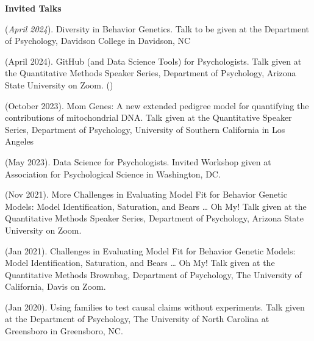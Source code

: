{\large {\bf Invited Talks}}\begin{etaremune}

\item\meb (\textit{April 2024}). Diversity in Behavior Genetics. Talk to be given at the Department of Psychology, Davidson College in Davidson, NC 
%
\item\meb (April 2024). GitHub (and Data Science Tools) for Psychologists. Talk given at the Quantitative Methods Speaker Series, Department of Psychology, Arizona State University on Zoom. ()
%
\item\meb (October 2023). Mom Genes: A new extended pedigree model for quantifying the contributions of mitochondrial DNA. Talk given at the Quantitative Speaker Series, Department of Psychology, University of Southern California in Los Angeles
\item\meb (May 2023). Data Science for Psychologists. Invited Workshop given at Association for Psychological Science in Washington, DC.
\item\meb (Nov 2021). More Challenges in Evaluating Model Fit for Behavior Genetic Models: Model Identification, Saturation, and Bears … Oh My! Talk given at the Quantitative Methods Speaker Series, Department of Psychology, Arizona State University on Zoom.
%
\item\meb (Jan 2021). Challenges in Evaluating Model Fit for Behavior Genetic Models: Model Identification, Saturation, and Bears … Oh My! Talk given at the Quantitative Methods Brownbag, Department of Psychology, The University of California, Davis on Zoom.
%
\item\meb (Jan 2020). Using families to test causal claims without experiments. Talk given at the Department of Psychology, The University of North Carolina at Greensboro in Greensboro, NC.
%
%

\end{etaremune}
